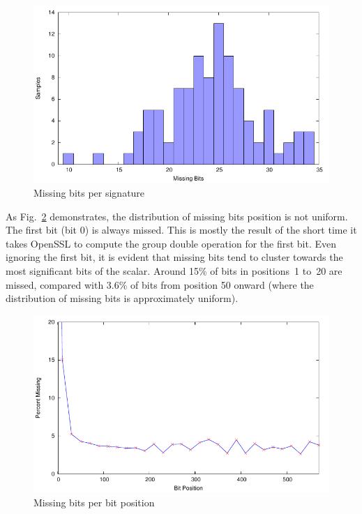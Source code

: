 \documentclass[twocolumn]{svjour3}
\begin{document}
\begin{figure}[htb]
\includegraphics[width=\columnwidth]{images/missing}
\caption{Missing bits per signature\label{dgm:dist}}
\end{figure}

As Fig.~\ref{dgm:missed} demonstrates, the distribution of missing bits position is not uniform.
The first bit (bit 0) is always missed.
This is mostly the result of the short time it takes OpenSSL to compute the group double operation for the first bit.
Even ignoring the first bit, it is evident that missing bits tend to cluster towards the most significant bits of the
scalar.
Around 15\% of bits in positions~1 to~20 are missed, compared with 3.6\% of bits from position 50 onward (where the distribution of missing bits is approximately uniform).

\begin{figure}[htb]
\includegraphics[width=\columnwidth]{images/positions}
\caption{Missing bits per bit position\label{dgm:missed}}
\end{figure}
\end{document}
